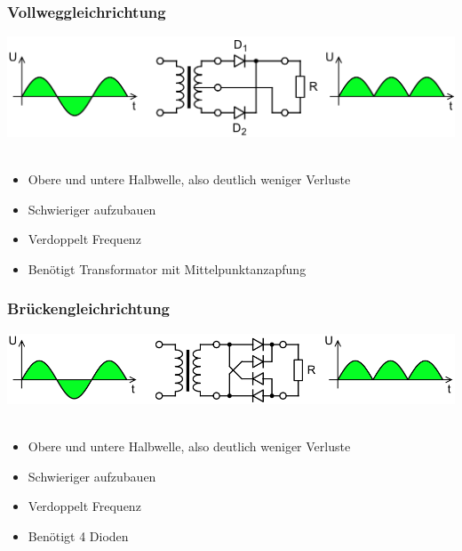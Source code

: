 \begin{frame}
    \frametitle{Vollweggleichrichtung}
    \begin{center}
    	\includegraphics[width=1\textwidth]{a05/Fullwave_rectifier.png}\\
        \tiny \hyperlink{refs}{\cite{wm}} \\[1em] \large
        \begin{itemize}
			\item Obere und untere Halbwelle, also deutlich weniger Verluste
			\item Schwieriger aufzubauen
			\item Verdoppelt Frequenz
			\item \huge Benötigt Transformator mit Mittelpunktanzapfung
    	\end{itemize}
 	\end{center}
\end{frame}

\begin{frame}
    \frametitle{Brückengleichrichtung}
    \begin{center}
    	\includegraphics[width=1\textwidth]{a05/Gratz_rectifier.png}\\
        \tiny \hyperlink{refs}{\cite{wm}} \\[1em] \large
        \begin{itemize}
			\item Obere und untere Halbwelle, also deutlich weniger Verluste
			\item Schwieriger aufzubauen
			\item Verdoppelt Frequenz
			\item Benötigt 4 Dioden
    	\end{itemize}
 	\end{center}
\end{frame}

